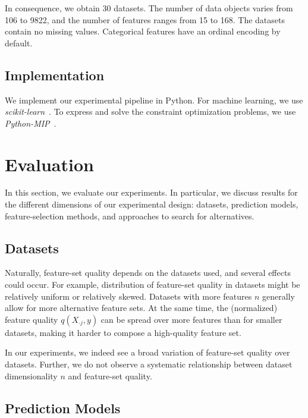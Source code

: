 \documentclass[conference]{IEEEtran}
\theoremstyle{definition}
\begin{document}
In consequence, we obtain 30 datasets.
The number of data objects varies from 106 to 9822, and the number of features ranges from 15 to 168.
The datasets contain no missing values.
Categorical features have an ordinal encoding by default.

\subsection{Implementation}
\label{sec:experimental-design:implementation}

We implement our experimental pipeline in Python.
For machine learning, we use \emph{scikit-learn}~\cite{pedregosa2011scikit-learn}.
To express and solve the constraint optimization problems, we use \emph{Python-MIP}~\cite{python-mip}.

\section{Evaluation}
\label{sec:evaluation}

In this section, we evaluate our experiments.
In particular, we discuss results for the different dimensions of our experimental design:
datasets, prediction models, feature-selection methods, and approaches to search for alternatives.

\subsection{Datasets}

Naturally, feature-set quality depends on the datasets used, and several effects could occur.
For example, distribution of feature-set quality in datasets might be relatively uniform or relatively skewed.
Datasets with more features $n$ generally allow for more alternative feature sets.
At the same time, the (normalized) feature quality $q(X_{\cdot{}j},y)$ can be spread over more features than for smaller datasets, making it harder to compose a high-quality feature set.

In our experiments, we indeed see a broad variation of feature-set quality over datasets.
Further, we do not observe a systematic relationship between dataset dimensionality $n$ and feature-set quality.

\subsection{Prediction Models}
\end{document}
